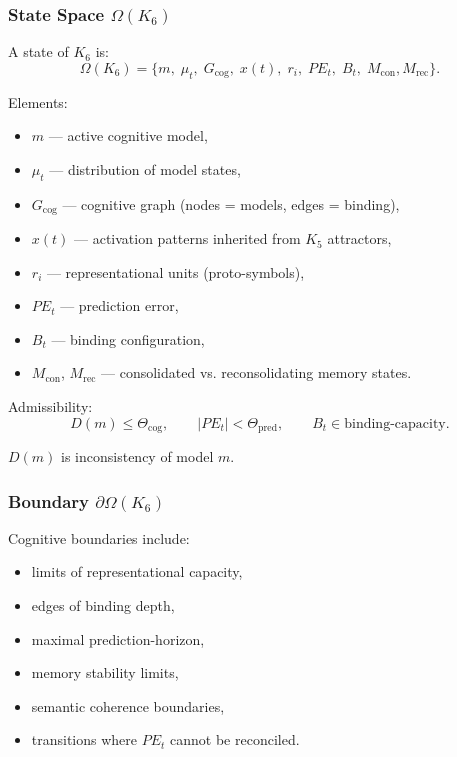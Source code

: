 \subsubsection{State Space \texorpdfstring{$\Omega(K_6)$}{\Omega(K_6)}}

A state of $K_6$ is:
\[
\Omega(K_6) = 
\{
m,\; \mu_t,\; G_{\mathrm{cog}},\;
x(t),\; r_i,\;
PE_t,\; B_t,\;
M_{\mathrm{con}}, M_{\mathrm{rec}}
\}.
\]

Elements:
\begin{itemize}
    \item $m$ — active cognitive model,
    \item $\mu_t$ — distribution of model states,
    \item $G_{\mathrm{cog}}$ — cognitive graph (nodes = models, edges = binding),
    \item $x(t)$ — activation patterns inherited from $K_5$ attractors,
    \item $r_i$ — representational units (proto-symbols),
    \item $PE_t$ — prediction error,
    \item $B_t$ — binding configuration,
    \item $M_{\mathrm{con}}$, $M_{\mathrm{rec}}$ — consolidated vs. reconsolidating memory states.
\end{itemize}

Admissibility:
\[
D(m) \le \Theta_{\mathrm{cog}}, \qquad
|PE_t| < \Theta_{\mathrm{pred}}, \qquad
B_t \in \text{binding-capacity}.
\]

$D(m)$ is inconsistency of model $m$.

\subsubsection{Boundary \texorpdfstring{$\partial\Omega(K_6)$}{\partial\Omega(K_6)}}

Cognitive boundaries include:
\begin{itemize}
    \item limits of representational capacity,
    \item edges of binding depth,
    \item maximal prediction-horizon,
    \item memory stability limits,
    \item semantic coherence boundaries,
    \item transitions where $PE_t$ cannot be reconciled.
\end{itemize}

